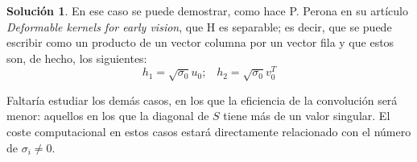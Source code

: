 \documentclass[a4paper, 11pt]{article}
\theoremstyle{definition}
\newtheorem*{solucion}{Solución}
\theoremstyle{theorem}
\begin{document}
\begin{solucion}
      En ese caso se puede demostrar, como hace P. Perona en su artículo \emph{Deformable kernels for early vision}, que H es separable; es decir, que se puede escribir como un producto de un vector columna por un vector fila y que estos son, de hecho, los siguientes:
      \[
      h_1 = \sqrt{\sigma_0}u_0; \;\;\; h_2 = \sqrt{\sigma_0}v_0^T
      \]

      Faltaría estudiar los demás casos, en los que la eficiencia de la convolución será menor: aquellos en los que la diagonal de $S$ tiene más de un valor singular. El coste computacional en estos casos estará directamente relacionado con el número de $\sigma_i \neq 0$.

  \end{solucion}
\end{document}
